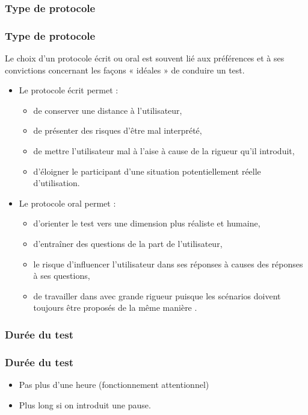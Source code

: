 			\subsubsection{Type de protocole} 
			\begin{frame}[allowframebreaks]
			\frametitle{Type de protocole }
				Le choix d'un protocole écrit ou oral est souvent lié aux préférences et à ses convictions concernant les façons « idéales » de conduire un test.

				\begin{itemize}
				\item Le protocole écrit permet :
					\begin{itemize}
					\item de conserver une distance à l'utilisateur,
					\item de présenter des risques d'être mal interprété,
					\item de mettre l'utilisateur mal à l'aise à cause de la rigueur qu'il introduit,
					\item d'éloigner le participant d'une situation potentiellement réelle d'utilisation. 
					\end{itemize} 
				\framebreak
				\item Le protocole oral permet :
				\begin{itemize}
					\item d'orienter le test vers une dimension plus réaliste et humaine,
					\item d'entraîner des questions de la part de l'utilisateur,
					\item le risque d'influencer l'utilisateur dans ses réponses à causes des réponses à ses questions,
					\item de travailler dans avec grande rigueur puisque les scénarios doivent toujours être proposés de la même manière . 
					\end{itemize} 
				\end{itemize} 
				\end{frame} 
				
				
				
			\subsubsection{Durée du test} 
			\begin{frame}[allowframebreaks]
			\frametitle{Durée du test}
				

				\begin{itemize}
				\item Pas plus d'une heure (fonctionnement attentionnel)
				\item Plus long si on introduit une pause. 	
				\end{itemize} 
				\end{frame} 	
				
